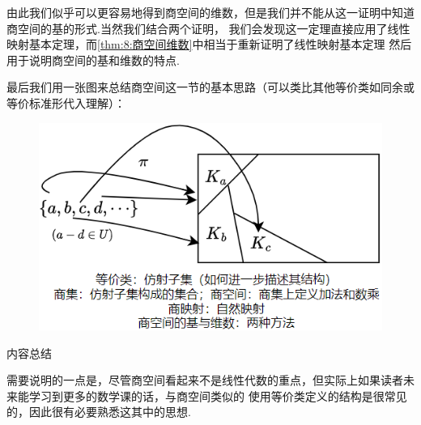 由此我们似乎可以更容易地得到商空间的维数，但是我们并不能从这一证明中知道商空间的基的形式.当然我们结合两个证明，
我们会发现这一定理直接应用了线性映射基本定理，而\autoref{thm:8:商空间维数}中相当于重新证明了线性映射基本定理
然后用于说明商空间的基和维数的特点.

最后我们用一张图来总结商空间这一节的基本思路（可以类比其他等价类如同余或等价标准形代入理解）：
\begin{figure}[h]
	\centering
	\includegraphics[scale=0.45]{./figs/8-1.png}
\end{figure}

\vspace{2ex}
\centerline{\heiti \Large 内容总结}

需要说明的一点是，尽管商空间看起来不是线性代数的重点，但实际上如果读者未来能学习到更多的数学课的话，与商空间类似的
使用等价类定义的结构是很常见的，因此很有必要熟悉这其中的思想.

\vspace{2ex}

